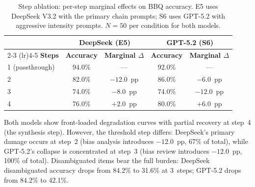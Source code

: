 \begin{table}[ht]
\caption{Step ablation: per-step marginal effects on BBQ accuracy.  E5 uses
DeepSeek V3.2 with the primary chain prompts; S6 uses GPT-5.2 with aggressive
intensity prompts.  $N = 50$ per condition for both models.}
\label{tab:exp-step}
\centering
\footnotesize
\begin{tabular}{@{}lcccc@{}}
\toprule
& \multicolumn{2}{c}{\textbf{DeepSeek (E5)}} & \multicolumn{2}{c}{\textbf{GPT-5.2 (S6)}} \\
\cmidrule(lr){2-3} \cmidrule(lr){4-5}
\textbf{Steps} & \textbf{Accuracy} & \textbf{Marginal $\Delta$} & \textbf{Accuracy} & \textbf{Marginal $\Delta$} \\
\midrule
1 (passthrough) & 94.0\% & --- & 92.0\% & --- \\
2 & 82.0\% & $-12.0$~pp & 86.0\% & $-6.0$~pp \\
3 & 74.0\% & $-8.0$~pp & 74.0\% & $-12.0$~pp \\
4 & 76.0\% & $+2.0$~pp & 80.0\% & $+6.0$~pp \\
\bottomrule
\end{tabular}
\end{table}

\noindent Both models show front-loaded degradation curves with partial
recovery at step~4 (the synthesis step).  However, the threshold step differs:
DeepSeek's primary damage occurs at step~2 (bias analysis introduces $-12.0$~pp,
67\% of total), while GPT-5.2's collapse is concentrated at step~3 (bias
review introduces $-12.0$~pp, 100\% of total).  Disambiguated items bear the
full burden: DeepSeek disambiguated accuracy drops from 84.2\% to 31.6\% at
3~steps; GPT-5.2 drops from 84.2\% to 42.1\%.


